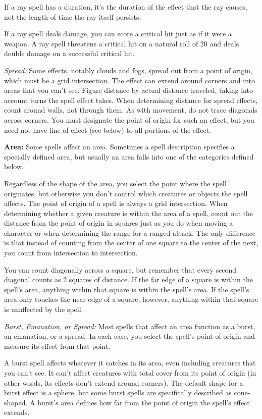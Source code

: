 If a ray spell has a duration, it's the duration of the effect that the ray causes, not the length of time the ray itself persists.

If a ray spell deals damage, you can score a critical hit just as if it were a weapon. A ray spell threatens a critical hit on a natural roll of 20 and deals double damage on a successful critical hit.

\textit{Spread:} Some effects, notably clouds and fogs, spread out from a point of origin, which must be a grid intersection. The effect can extend around corners and into areas that you can't see. Figure distance by actual distance traveled, taking into account turns the spell effect takes. When determining distance for spread effects, count around walls, not through them. As with movement, do not trace diagonals across corners. You must designate the point of origin for such an effect, but you need not have line of effect (see below) to all portions of the effect.

\textbf{Area:} Some spells affect an area. Sometimes a spell description specifies a specially defined area, but usually an area falls into one of the categories defined below.

Regardless of the shape of the area, you select the point where the spell originates, but otherwise you don't control which creatures or objects the spell affects. The point of origin of a spell is always a grid intersection. When determining whether a given creature is within the area of a spell, count out the distance from the point of origin in squares just as you do when moving a character or when determining the range for a ranged attack. The only difference is that instead of counting from the center of one square to the center of the next, you count from intersection to intersection.

You can count diagonally across a square, but remember that every second diagonal counts as 2 squares of distance. If the far edge of a square is within the spell's area, anything within that square is within the spell's area. If the spell's area only touches the near edge of a square, however, anything within that square is unaffected by the spell.

\textit{Burst, Emanation, or Spread:} Most spells that affect an area function as a burst, an emanation, or a spread. In each case, you select the spell's point of origin and measure its effect from that point.

A burst spell affects whatever it catches in its area, even including creatures that you can't see. It can't affect creatures with total cover from its point of origin (in other words, its effects don't extend around corners). The default shape for a burst effect is a sphere, but some burst spells are specifically described as cone-shaped. A burst's area defines how far from the point of origin the spell's effect extends.

